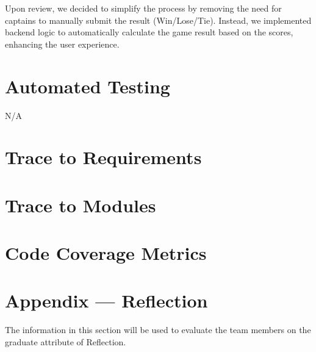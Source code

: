 \documentclass[12pt, titlepage]{article}
\begin{document}
Upon review, we decided to simplify the process by removing the need for captains to manually submit the result (Win/Lose/Tie). Instead, we implemented backend logic to automatically calculate the game result based on the scores, enhancing the user experience.

\section{Automated Testing}
N/A
		
\section{Trace to Requirements}
		
\section{Trace to Modules}		

\section{Code Coverage Metrics}




\newpage{}
\section*{Appendix --- Reflection}

The information in this section will be used to evaluate the team members on the
graduate attribute of Reflection.


\end{document}
